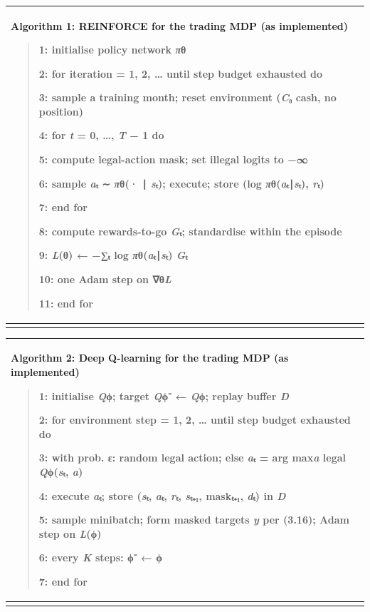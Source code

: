 {\def\LTcaptype{none} %
\begin{longtable}[]{@{}
  >{\raggedright\arraybackslash}p{}@{}}
\toprule\noalign{}
\begin{minipage}[b]{\linewidth}\raggedright
\textbf{Algorithm 1: REINFORCE for the trading MDP (as implemented)}

\begin{quote}
1: \textbf{initialise} policy network \emph{π}θ

2: \textbf{for} iteration = 1, 2, \ldots{} until step budget exhausted
\textbf{do}

3: sample a training month; reset environment (\emph{C}₀ cash, no
position)

4: \textbf{for} \emph{t} = 0, \ldots, \emph{T} − 1 \textbf{do}

5: compute legal-action mask; set illegal logits to −∞

6: sample \emph{a}ₜ ∼ \emph{π}θ(· ∣ \emph{s}ₜ); execute; store (log
\emph{π}θ(\emph{a}ₜ∣\emph{s}ₜ), \emph{r}ₜ)

7: \textbf{end for}

8: compute rewards-to-go \emph{G}ₜ; standardise within the episode

9: \emph{L}(θ) ← −∑ₜ log \emph{π}θ(\emph{a}ₜ∣\emph{s}ₜ) \emph{G}ₜ

10: one Adam step on ∇θ\emph{L}

11: \textbf{end for}
\end{quote}
\end{minipage} \\
\midrule\noalign{}
\endhead
\bottomrule\noalign{}
\endlastfoot
\end{longtable}
}

{\def\LTcaptype{none} %
\begin{longtable}[]{@{}
  >{\raggedright\arraybackslash}p{}@{}}
\toprule\noalign{}
\begin{minipage}[b]{\linewidth}\raggedright
\textbf{Algorithm 2: Deep Q-learning for the trading MDP (as
implemented)}

\begin{quote}
1: \textbf{initialise} \emph{Q}ϕ; target \emph{Q}ϕ⁻ ← \emph{Q}ϕ; replay
buffer \emph{D}

2: \textbf{for} environment step = 1, 2, \ldots{} until step budget
exhausted \textbf{do}

3: with prob. ε: random legal action; else \emph{a}ₜ = arg max\emph{a}
legal \emph{Q}ϕ(\emph{s}ₜ, \emph{a})

4: execute \emph{a}ₜ; store (\emph{s}ₜ, \emph{a}ₜ, \emph{r}ₜ,
\emph{s}ₜ₊₁, maskₜ₊₁, \emph{d}ₜ) in \emph{D}

5: sample minibatch; form masked targets \emph{y} per (3.16); Adam step
on \emph{L}(ϕ)

6: every \emph{K} steps: ϕ⁻ ← ϕ

7: \textbf{end for}
\end{quote}
\end{minipage} \\
\midrule\noalign{}
\endhead
\bottomrule\noalign{}
\endlastfoot
\end{longtable}
}

